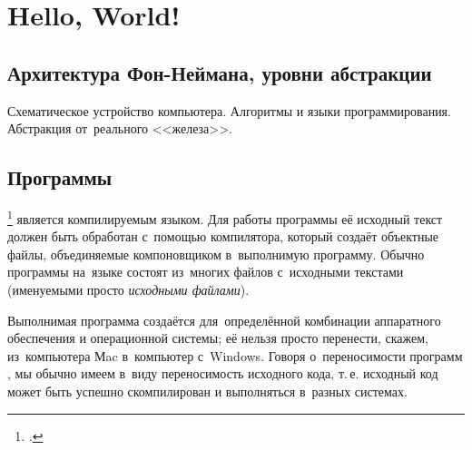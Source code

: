 
\chapter{Hello, World!}

\section{Архитектура Фон-Неймана, уровни абстракции}
Схематическое устройство компьютера. Алгоритмы и языки программирования. Абстракция от~реального <<железа>>.



\section{Программы}
\footcite{Stroustrup:2019:ru} является компилируемым языком. Для работы программы её исходный текст должен быть обработан с~помощью компилятора, который создаёт объектные файлы, объединяемые компоновщиком в~выполнимую программу. Обычно программы на~языке  состоят из~многих файлов с~исходными текстами (именуемыми просто \textit{исходными файлами}).

\begin{center}\end{center}

Выполнимая программа создаётся для~определённой комбинации аппаратного обеспечения и операционной системы; её нельзя просто перенести, скажем, из~компьютера Мac в~компьютер с~Windows. Говоря о~переносимости программ , мы обычно имеем в~виду переносимость исходного кода, т.\,е. исходный код может быть успешно скомпилирован и выполняться в~разных
системах.


